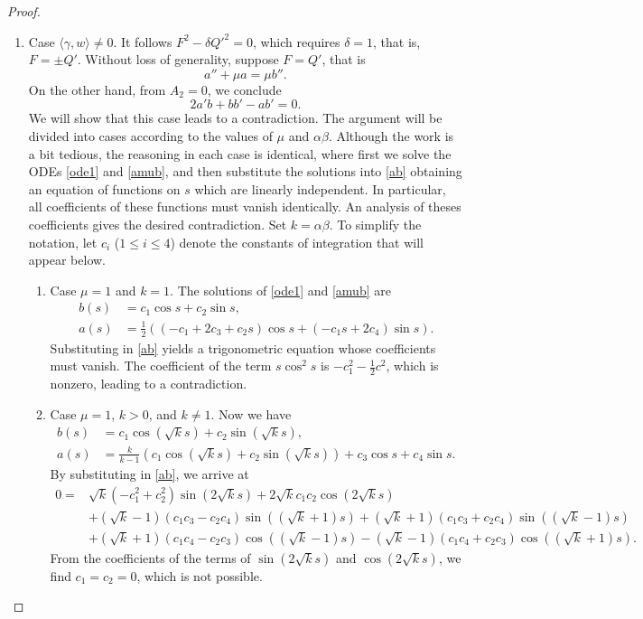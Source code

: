 \documentclass[10pt,a4paper]{amsart}
\begin{document}
\begin{proof}
\begin{enumerate}
\begin{enumerate}
\item Case  $\langle \gamma, w \rangle \neq 0$. It follows $F^2-\delta Q'^2=0$, which requires $\delta=1$, that is, $F=\pm Q'$. Without loss of generality, suppose $F=Q'$, that is
\begin{equation}
a''+\mu a=\mu b''. \label{amub}
\end{equation}
On the other hand, from $A_2=0$, we conclude
\begin{equation}
2a'b+bb'-ab'=0. \label{ab}
\end{equation}
We will show that this case leads to a contradiction. The argument will be divided into cases according to the values of $\mu$ and $\alpha\beta$. Although the work is a bit tedious, the reasoning in each case is identical, where first we   solve the ODEs \eqref{ode1} and \eqref{amub}, and then substitute the solutions into \eqref{ab} obtaining an equation of functions on $s$ which are linearly independent. In particular, all coefficients of these functions must vanish identically. An analysis of theses coefficients gives the desired contradiction. Set $k=\alpha\beta$. To simplify the notation, let $c_i$ ($1 \leq i \leq 4$) denote the constants of integration that will appear below.
\begin{enumerate}
\item Case $\mu=1$ and $k=1$. The solutions of \eqref{ode1} and \eqref{amub} are
\begin{equation*}
\begin{split}
b(s)&=c_1\cos s+c_2 \sin s,\\
a(s)&=\frac12 ((-c_1+2c_3+c_2s)\cos s+(-c_1s+2c_4)\sin s).
\end{split}
\end{equation*}
Substituting   in \eqref{ab} yields a trigonometric equation whose coefficients must vanish. The coefficient of the term $s \cos^2 s$ is $-c_1^2-\frac12 c^2$, which is nonzero, leading to a contradiction.

\item Case $\mu=1$, $k >0$, and $k\neq1$. Now we have
\begin{equation*}
\begin{split}
 b(s)&=c_1\cos (\sqrt{k}s)+c_2 \sin (\sqrt{k}s),\\
a(s)&=\frac{k }{k-1}(c_1 \cos (\sqrt{k} s)+c_2 \sin (\sqrt{k} s))+c_3 \cos s+c_4 \sin s.
\end{split}
\end{equation*}
By substituting   in \eqref{ab}, we arrive at
$$
\begin{aligned}
0=& \sqrt{k}(-c_1^2+c_2^2)\sin(2\sqrt{k}s)
+ 2\sqrt{k}c_1c_2\cos(2\sqrt{k}s) \\
&+ (\sqrt{k}-1)(c_1c_3-c_2c_4)\sin((\sqrt{k}+1)s)
+ (\sqrt{k}+1)(c_1c_3+c_2c_4)\sin((\sqrt{k}-1)s) \\
&+ (\sqrt{k}+1)(c_1c_4-c_2c_3)\cos((\sqrt{k}-1)s)
- (\sqrt{k}-1)(c_1c_4+c_2c_3)\cos((\sqrt{k}+1)s).
\end{aligned}
$$
From the coefficients of the terms of $\sin(2\sqrt{k}s)$ and $\cos(2\sqrt{k}s)$, we find $c_1=c_2=0$, which is not possible.


\end{enumerate}
\end{enumerate}
\end{enumerate}
\end{proof}
\end{document}
